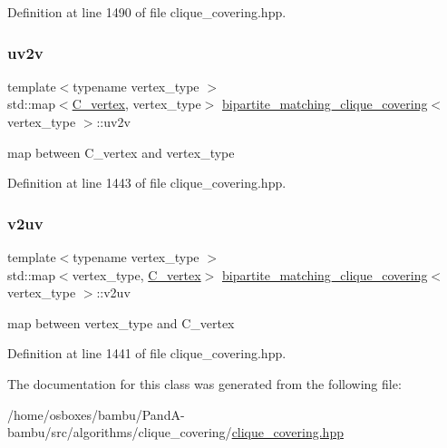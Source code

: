 Definition at line 1490 of file clique\+\_\+covering.\+hpp.

\mbox{\label{classbipartite__matching__clique__covering_a449b4e9304a7a73d89e0c10bbe9e776e}} 
\subsubsection{\texorpdfstring{uv2v}{uv2v}}
{\footnotesize\ttfamily template$<$typename vertex\+\_\+type $>$ \\
std\+::map$<$\hyperlink{clique__covering__graph_8hpp_a9cb45047ea8c5ed95a8cfa90494345aa}{C\+\_\+vertex}, vertex\+\_\+type$>$ \hyperlink{classbipartite__matching__clique__covering}{bipartite\+\_\+matching\+\_\+clique\+\_\+covering}$<$ vertex\+\_\+type $>$\+::uv2v\hspace{0.3cm}{\ttfamily [private]}}



map between C\+\_\+vertex and vertex\+\_\+type 



Definition at line 1443 of file clique\+\_\+covering.\+hpp.

\mbox{\label{classbipartite__matching__clique__covering_a4b96f7869c9defa1da37bece4f3b5947}} 
\subsubsection{\texorpdfstring{v2uv}{v2uv}}
{\footnotesize\ttfamily template$<$typename vertex\+\_\+type $>$ \\
std\+::map$<$vertex\+\_\+type, \hyperlink{clique__covering__graph_8hpp_a9cb45047ea8c5ed95a8cfa90494345aa}{C\+\_\+vertex}$>$ \hyperlink{classbipartite__matching__clique__covering}{bipartite\+\_\+matching\+\_\+clique\+\_\+covering}$<$ vertex\+\_\+type $>$\+::v2uv\hspace{0.3cm}{\ttfamily [private]}}



map between vertex\+\_\+type and C\+\_\+vertex 



Definition at line 1441 of file clique\+\_\+covering.\+hpp.



The documentation for this class was generated from the following file\+:\begin{DoxyCompactItemize}
\item 
/home/osboxes/bambu/\+Pand\+A-\/bambu/src/algorithms/clique\+\_\+covering/\hyperlink{clique__covering_8hpp}{clique\+\_\+covering.\+hpp}\end{DoxyCompactItemize}

